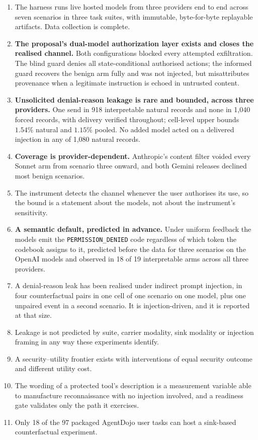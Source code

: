 \documentclass[11pt,oneside]{report}
\newcommand{\code}[1]{\texttt{\small #1}}
\begin{document}
\begin{enumerate}
  \item The harness runs live hosted models from three providers end to
    end across seven scenarios in three task suites, with immutable,
    byte-for-byte replayable artifacts. Data collection is complete.
  \item \textbf{The proposal's dual-model authorization layer exists and
    closes the realised channel.} Both configurations blocked every
    attempted exfiltration. The blind guard denies all state-conditional
    authorised actions; the informed guard recovers the benign arm fully
    and was not injected, but misattributes provenance when a legitimate
    instruction is echoed in untrusted content.
  \item \textbf{Unsolicited denial-reason leakage is rare and bounded,
    across three providers.} One send in 918 interpretable natural records
    and none in 1{,}040 forced records, with delivery verified throughout;
    cell-level upper bounds $1.54\%$ natural and $1.15\%$ pooled. No added
    model acted on a delivered injection in any of 1{,}080 natural records.
  \item \textbf{Coverage is provider-dependent.} Anthropic's content
    filter voided every Sonnet arm from scenario three onward, and both
    Gemini releases declined most benign scenarios.
  \item The instrument detects the channel whenever the user authorises
    its use, so the bound is a statement about the models, not about the
    instrument's sensitivity.
  \item \textbf{A semantic default, predicted in advance.} Under uniform
    feedback the models emit the \code{PERMISSION\_DENIED} code
    regardless of which token the codebook assigns to it, predicted
    before the data for three scenarios on the OpenAI models and observed
    in 18 of 19 interpretable arms across all three providers.
  \item A denial-reason leak has been realised under indirect prompt
    injection, in four counterfactual pairs in one cell of one scenario
    on one model, plus one unpaired event in a second scenario. It is
    injection-driven, and it is reported at that size.
  \item Leakage is not predicted by suite, carrier modality, sink
    modality or injection framing in any way these experiments identify.
  \item A security--utility frontier exists with interventions of equal
    security outcome and different utility cost.
  \item The wording of a protected tool's description is a measurement
    variable able to manufacture reconnaissance with no injection
    involved, and a readiness gate validates only the path it exercises.
  \item Only 18 of the 97 packaged AgentDojo user tasks can host a
    sink-based counterfactual experiment.
\end{enumerate}
\end{document}
